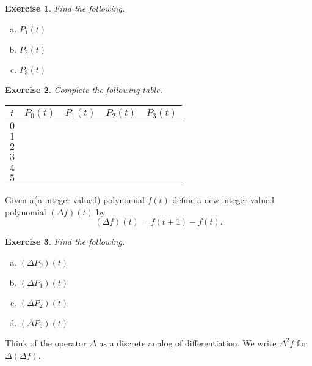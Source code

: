 \documentclass[12pt]{article}
\theoremstyle{plain}
\newtheorem{ex}{Exercise}
\begin{document}
\begin{ex}
  Find the following.
  \begin{enumerate}[(a)]
    \item $P_1(t)$
    \item $P_2(t)$
    \item $P_3(t)$
  \end{enumerate}
\end{ex}
\pagebreak
\begin{ex}
  Complete the following table.
  \begin{center}
    \begin{tabular}{| c | c | c | c | c |} \hline
      $t$ & $P_0(t)$ & $P_1(t)$ & $P_2(t)$ & $P_3(t)$ \\ \hline
      $0$ &          &          &          &          \\ \hline
      $1$ &          &          &          &          \\ \hline
      $2$ &          &          &          &          \\ \hline
      $3$ &          &          &          &          \\ \hline
      $4$ &          &          &          &          \\ \hline
      $5$ &          &          &          &          \\ \hline
    \end{tabular}
  \end{center}
\end{ex}

Given a(n integer valued) polynomial $f(t)$ define a new integer-valued polynomial $(\Delta f)(t)$ by
\[
  (\Delta f)(t)=f(t+1)-f(t).
\]

\begin{ex}
  Find the following.
  \begin{enumerate}[(a)]
    \item $(\Delta P_0)(t)$
    \item $(\Delta P_1)(t)$
    \item $(\Delta P_2)(t)$
    \item $(\Delta P_3)(t)$
  \end{enumerate}
\end{ex}

Think of the operator $\Delta$ as a discrete analog of differentiation. We write $\Delta^2 f$ for $\Delta(\Delta f)$.
\end{document}
